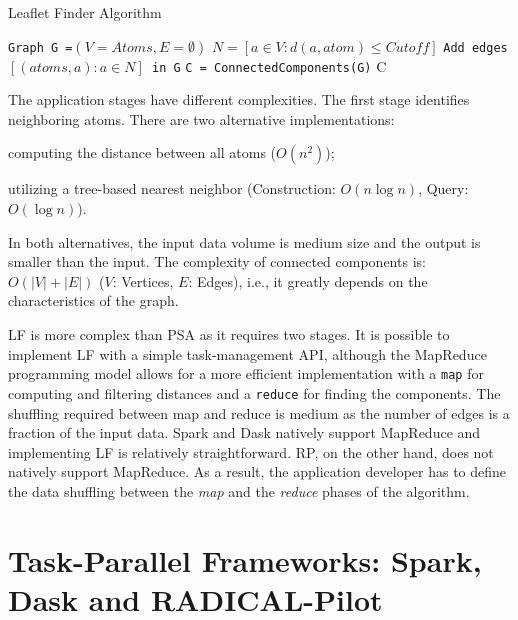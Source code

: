 \begin{algorithm}[t]
    \scriptsize
    \caption{Leaflet Finder Algorithm}
    \label{alg:leafletfinder}
    \begin{algorithmic}[1]
        \State \texttt{Graph G =$(V=Atoms,E=\emptyset)$}
        \State \texttt{$N = [a\in V: d(a,atom)\le Cutoff]$}
        \State \texttt{Add edges $[(atoms,a): a \in N]$ in G}
        \EndFor
        \State \texttt{C = ConnectedComponents(G)}
        \State \Return C
        \EndProcedure
    \end{algorithmic}
\end{algorithm}

The application stages have different complexities. The first stage identifies
neighboring atoms. There are two alternative implementations:
\begin{inparaenum}[i)]
    \item computing the distance between all atoms ($O(n^2)$);
    \item utilizing a tree-based nearest neighbor (Construction: $O(n\log n)$,
    Query: $O(\log n)$).
\end{inparaenum}
In both alternatives, the input data volume is medium size and the output is
smaller than the input. The complexity of connected components is: $O(|V|+|E|)$
($V$: Vertices, $E$: Edges), i.e., it greatly depends on the characteristics of
the graph.

LF is more complex than PSA as it requires two stages. It is possible to
implement LF with a simple task-management API, although the MapReduce
programming model allows for a more efficient implementation with a \texttt{map}
for computing and filtering distances and a \texttt{reduce} for finding the
components. The shuffling required between map and reduce is medium as the
number of edges is a fraction of the input data. Spark and Dask natively support
MapReduce and implementing LF is relatively straightforward. RP, on
the other hand, does not natively support MapReduce. As a result, the
application developer has to define the data shuffling between the \emph{map}
and the \emph{reduce} phases of the algorithm.

\section{Task-Parallel Frameworks: Spark, Dask and RADICAL-Pilot}
\label{sec:frameworks}

